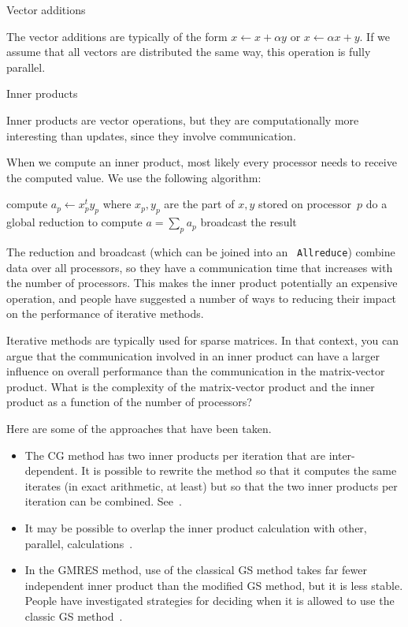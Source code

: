  {Vector additions}

The vector additions are
typically of the form $x\leftarrow x+\alpha y$ or $x\leftarrow \alpha x+y$.
If we assume that all vectors are distributed the same way, this
operation is fully parallel.

 {Inner products}

Inner products are vector operations, but they are computationally
more interesting than updates, since they involve communication. 

When we compute an inner product, most likely 
every processor needs to receive the computed value. We
use the following algorithm:

\begin{displayalgorithm}
   {
    compute $a_p\leftarrow x_p^ty_p$ where $x_p,y_p$ are the part of
    $x,y$ stored on processor~$p$ }
    do a global reduction to compute $a=\sum_p a_p$ \;
    broadcast the result
  \caption{Compute $a\leftarrow x^ty$ where $x,y$ are distributed vectors}
\end{displayalgorithm}

The reduction and broadcast (which can be joined into an {\tt
  Allreduce}) combine data over all processors, so they have a
communication time that increases with the number of processors. This
makes the inner product potentially an expensive operation, and people
have suggested a number of ways to reducing their impact on the
performance of iterative methods.

\begin{exercise}
  Iterative methods are typically used for sparse matrices. In that
  context, you can argue that the communication involved in an inner product
  can have a larger influence on overall performance than the
  communication in the matrix-vector product. What is the
  complexity of the matrix-vector product and the inner product as a
  function of the number of processors?
\end{exercise}

Here are some of the approaches that have been taken.
\begin{itemize}
\item The \ac{CG} method has two inner products per iteration that are
  inter-dependent. It is possible to rewrite the method so that it
  computes the same iterates (in exact arithmetic, at least) but so
  that the two inner products per iteration can be
  combined. See~\cite{ChGe:sstep,DAzEijRo:ppscicomp,Me:multicg,YandBrent:bicgstab}.
\item It may be possible to overlap the inner product calculation with
  other, parallel, calculations~\cite{dehevo92:acta}.
\item In the \ac{GMRES} method, use of the classical \acf{GS}
  method takes far fewer independent inner product than the modified
  \ac{GS} method, but it is less stable. People have investigated strategies for deciding
  when it is allowed to use the classic \ac{GS} method~\cite{Langou:thesis}.
\end{itemize}

